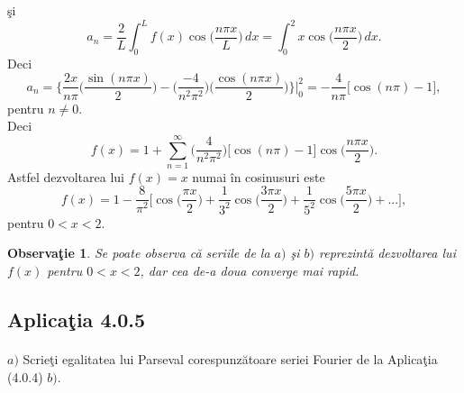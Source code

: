 \documentclass[a4paper,openany,12pt]{report}
\newtheorem{notice}{Observa\c tie}[section]
\begin{document}
\c si 
\begin{equation*}
a_n=\frac{2}{L}\int_0^L f(x) \cos\bigg(\frac{n\pi x}{L}\bigg)\, dx=\int_0^2 x \cos\bigg(\frac{n\pi x}{2}\bigg)\, dx.
\end{equation*}
Deci 
\begin{equation*}
a_n=\bigg\{\frac{2x}{n\pi}\bigg(\frac{\sin(n\pi x)}{2}\bigg)-\bigg(\frac{-4}{n^2\pi^2}\bigg)\bigg(\frac{\cos(n\pi x)}{2}\bigg)\bigg\} \bigg|_{0}^{2} = -\frac{4}{n\pi}\Big[\cos(n\pi)-1\Big],
\end{equation*}
pentru $n\neq0$.\\
Deci
\begin{equation*}
f(x)=1+\sum_{n=1}^\infty \bigg(\frac{4}{n^2\pi^2}\bigg)\Big[\cos(n\pi)-1\Big] \cos\bigg(\frac{n\pi x}{2}\bigg).
\end{equation*}
Astfel dezvoltarea lui $f(x)=x$ numai \^ in cosinusuri este
\begin{equation*}
f(x)=1-\frac{8}{\pi^2}\bigg[\cos\bigg(\frac{\pi x}{2}\bigg)+\frac{1}{3^2}\cos\bigg(\frac{3\pi x}{2}\bigg)+\frac{1}{5^2}\cos\bigg(\frac{5\pi x}{2}\bigg)+...\bigg],
\end{equation*}
pentru $0<x<2.$
\begin{notice}Se poate observa c\u a seriile de la $a)$ \c si $b)$ reprezint\u a dezvoltarea lui $f(x)$ pentru $0<x<2$, dar cea de-a doua converge mai rapid. 
\end{notice}



\subsection*{Aplica\c tia 4.0.5}
\paragraph*{}$a)$ Scrie\c ti egalitatea lui Parseval corespunz\u atoare seriei Fourier de la Aplica\c tia (4.0.4) $b)$.
\end{document}
